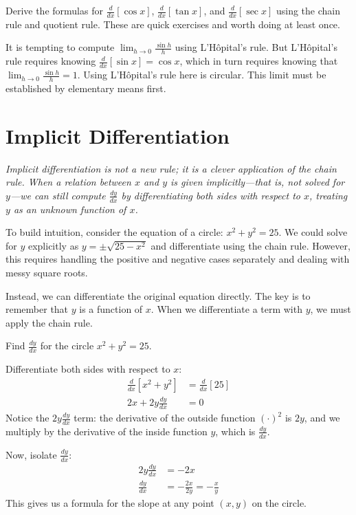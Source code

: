 \begin{remark}
Derive the formulas for $\frac{d}{dx}[\cos x]$, $\frac{d}{dx}[\tan x]$, and $\frac{d}{dx}[\sec x]$ using the chain rule and quotient rule.  These are quick exercises and worth doing at least once.
\end{remark}

\begin{remark}[Warning]
It is tempting to compute $\lim_{h \to 0}\frac{\sin h}{h}$ using L'H\^opital's rule.  But L'H\^opital's rule requires knowing $\frac{d}{dx}[\sin x] = \cos x$, which in turn requires knowing that $\lim_{h \to 0}\frac{\sin h}{h} = 1$.  Using L'H\^opital's rule here is circular.  This limit must be established by elementary means first.
\end{remark}

\section{Implicit Differentiation}
\label{sec:3.13}

\textit{Implicit differentiation is not a new rule; it is a clever application of the chain rule.  When a relation between $x$ and $y$ is given implicitly---that is, not solved for $y$---we can still compute $\frac{dy}{dx}$ by differentiating both sides with respect to $x$, treating $y$ as an unknown function of $x$.}

To build intuition, consider the equation of a circle: $x^2 + y^2 = 25$. We could solve for $y$ explicitly as $y = \pm\sqrt{25 - x^2}$ and differentiate using the chain rule. However, this requires handling the positive and negative cases separately and dealing with messy square roots.

Instead, we can differentiate the original equation directly. The key is to remember that $y$ is a function of $x$. When we differentiate a term with $y$, we must apply the chain rule.

\begin{example}
\label{ex:3-13-simple}
Find $\frac{dy}{dx}$ for the circle $x^2 + y^2 = 25$.

Differentiate both sides with respect to $x$:
\begin{align*}
  \frac{d}{dx}[x^2 + y^2] &= \frac{d}{dx}[25] \\
  2x + 2y \frac{dy}{dx} &= 0
\end{align*}
Notice the $2y \frac{dy}{dx}$ term: the derivative of the outside function $(\cdot)^2$ is $2y$, and we multiply by the derivative of the inside function $y$, which is $\frac{dy}{dx}$.

Now, isolate $\frac{dy}{dx}$:
\begin{align*}
  2y \frac{dy}{dx} &= -2x \\
  \frac{dy}{dx} &= -\frac{2x}{2y} = -\frac{x}{y}
\end{align*}
This gives us a formula for the slope at any point $(x, y)$ on the circle.
\end{example}

